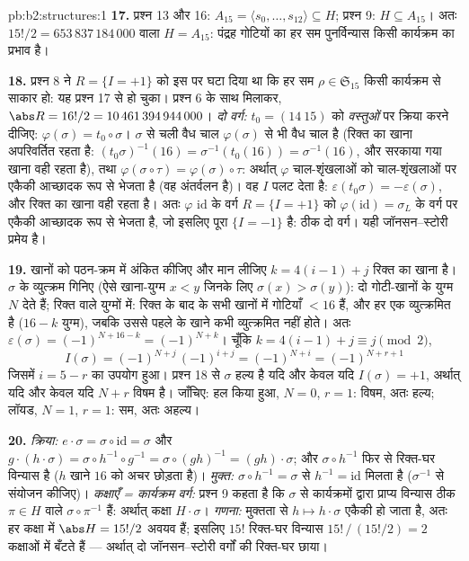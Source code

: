 \begin{solution}{pb:b2:structures:1}
\textbf{17.} प्रश्न 13 और 16: $A_{15} = \langle s_0, \dots,
s_{12}\rangle \subseteq H$; प्रश्न 9: $H \subseteq A_{15}$। अतः  $15!/2 = 653\,837\,184\,000$ वाला
$H = A_{15}$: पंद्रह गोटियों का हर सम पुनर्विन्यास किसी कार्यक्रम का प्रभाव है।

\textbf{18.} प्रश्न 8 ने $R = \{I = +1\}$ को इस पर घटा दिया था कि हर सम $\rho \in \mathfrak{S}_{15}$ किसी
कार्यक्रम से साकार हो: यह प्रश्न 17 से हो चुका। प्रश्न 6 के साथ
मिलाकर, $\abs R = 16!/2 =
10\,461\,394\,944\,000$। \emph{दो वर्ग:} $t_0 = (14\
15)$ को \emph{वस्तुओं} पर क्रिया करने
दीजिए: $\varphi(\sigma) = t_0 \circ
\sigma$। $\sigma$ से चली वैध चाल $\varphi(\sigma)$ से भी वैध चाल है (रिक्त का खाना
अपरिवर्तित रहता है: $(t_0\sigma)^{-1}(16) = \sigma^{-1}(t_0(16)) = \sigma^{-1}(16)$, और सरकाया गया खाना वही रहता है), तथा $\varphi(\sigma \circ \tau)
= \varphi(\sigma) \circ \tau$:
अर्थात् $\varphi$ चाल-शृंखलाओं को चाल-शृंखलाओं पर एकैकी आच्छादक रूप से भेजता
है (वह अंतर्वलन है)। वह $I$ पलट देता है: $\varepsilon(t_0\sigma) = -\varepsilon(\sigma)$, और रिक्त का खाना वही
रहता है। अतः $\varphi$ $\mathrm{id}$ के वर्ग $R = \{I = +1\}$ को $\varphi(\mathrm{id})
= \sigma_L$ के वर्ग पर एकैकी आच्छादक
रूप से भेजता है, जो इसलिए पूरा $\{I = -1\}$ है: ठीक दो वर्ग। यही
जॉनसन--स्टोरी प्रमेय है।

\textbf{19.} खानों को पठन-क्रम में अंकित कीजिए और मान लीजिए $k = 4(i -
1) + j$
रिक्त का खाना है। $\sigma$ के व्युत्क्रम गिनिए (ऐसे खाना-युग्म $x < y$ जिनके
लिए $\sigma(x) > \sigma(y)$): दो गोटी-खानों के युग्म $N$ देते हैं; रिक्त वाले युग्मों में:
रिक्त के बाद के सभी खानों में गोटियाँ $< 16$ हैं, और हर एक व्युत्क्रमित
है ($16 - k$ युग्म), जबकि उससे पहले के खाने कभी व्युत्क्रमित नहीं होते।
अतः $\varepsilon(\sigma) = (-1)^{N + 16 - k} = (-1)^{N + k}$। चूँकि $k = 4(i-1) + j \equiv j \pmod 2$,
\[
I(\sigma) = (-1)^{N + j}\,(-1)^{i + j} = (-1)^{N + i}
= (-1)^{N + r + 1}
\]
जिसमें $i = 5 - r$ का उपयोग हुआ। प्रश्न 18 से $\sigma$ हल्य है यदि और केवल यदि
$I(\sigma) = +1$, अर्थात् यदि और केवल यदि $N + r$ विषम है। जाँचिए: हल किया हुआ, $N = 0$,
$r
= 1$: विषम, अतः हल्य; लॉयड, $N = 1$, $r = 1$: सम, अतः अहल्य।

\textbf{20.} \emph{क्रिया:} $e \cdot \sigma = \sigma \circ
\mathrm{id} = \sigma$ और $g \cdot (h \cdot \sigma) = \sigma
\circ h^{-1} \circ g^{-1} = \sigma \circ (gh)^{-1} = (gh) \cdot
\sigma$; और $\sigma \circ h^{-1}$ फिर से रिक्त-घर
विन्यास है ($h$ खाने $16$ को अचर छोड़ता है)। \emph{मुक्त:} $\sigma \circ
h^{-1} = \sigma$ से $h^{-1} = \mathrm{id}$
मिलता है ($\sigma^{-1}$ से संयोजन कीजिए)। \emph{कक्षाएँ = कार्यक्रम वर्ग:}
प्रश्न 9 कहता है कि $\sigma$ से कार्यक्रमों द्वारा प्राप्य विन्यास ठीक
$\pi \in H$ वाले $\sigma \circ \pi^{-1}$ हैं: अर्थात् कक्षा $H
\cdot \sigma$। \emph{गणना:} मुक्तता से $h \mapsto h \cdot
\sigma$
एकैकी हो जाता है, अतः हर कक्षा में $\abs H = 15!/2$ अवयव हैं; इसलिए $15!$
रिक्त-घर विन्यास $15!\,/\,(15!/2) = 2$ कक्षाओं में बँटते हैं --- अर्थात् दो
जॉनसन--स्टोरी वर्गों की रिक्त-घर छाया।


\end{solution}
